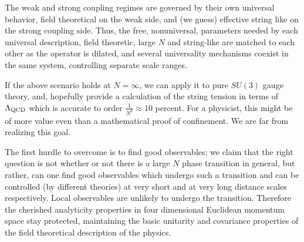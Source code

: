The weak and strong coupling regimes are governed by their own
universal behavior, field theoretical on the weak side, and (we
guess) effective string like on the strong coupling side. Thus,
the free, nonuniversal, parameters needed by
each universal description, field
theoretic, large $N$ and string-like are matched to each other as
the operator is dilated, and several universality mechanisms
coexist in the same system, controlling separate scale ranges.

If the above scenario holds at $N=\infty$, we can apply it to pure
$SU(3)$ gauge theory, and, hopefully provide a
calculation of the string tension in terms of $\Lambda_{\rm QCD}$
which is accurate to order $\frac{1}{ N^2}\approx 10$ percent. For
a physicist, this might be of more value even  than a mathematical
proof of confinement. We are far from realizing this goal.

The first hurdle to overcome is to find good observables; we claim
that the right question is not whether or not there is a large $N$
phase transition in general, but rather, can one find good
observables which undergo such a transition and can be controlled
(by different theories) at very short and at very long distance
scales respectively. Local observables are unlikely to undergo the
transition. Therefore the cherished analyticity properties in
four dimensional Euclidean momentum space stay protected,
maintaining the basic unitarity and covariance properties of the
field theoretical description of the physics.


